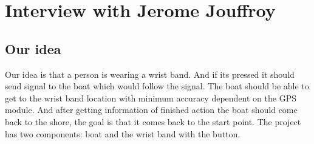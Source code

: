 

% 
\chapter{Interview with Jerome Jouffroy}
\renewcommand{\labelenumii}{\arabic{enumi}.\arabic{enumii}}
\renewcommand{\labelenumiii}{\arabic{enumi}.\arabic{enumii}.\arabic{enumiii}}
\renewcommand{\labelenumiv}{\arabic{enumi}.\arabic{enumii}.\arabic{enumiii}.\arabic{enumiv}}

\section{Our idea}
Our idea is that a person is wearing a wrist band. And if its pressed it should send signal to the boat which would follow the signal. 
The boat should be able to get to the wrist band location with minimum accuracy dependent on the GPS module. And after getting information of finished action the boat should 
come back to the shore, the goal is that it comes back to the start point. 
The project has two components: boat and the wrist band with the button. 

